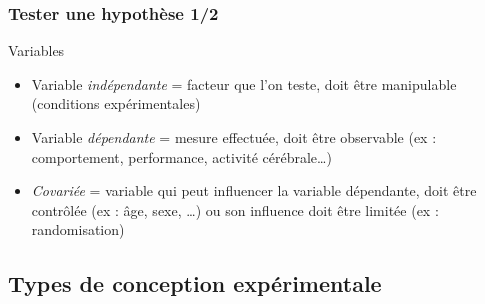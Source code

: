 \documentclass[xcolor=dvipsnames,english]{beamer}
\begin{document}
\begin{frame}
  \frametitle{Tester une hypothèse 1/2}
  \begin{block}{Variables}
    \begin{itemize}
      \item Variable \textit{indépendante} = facteur que l'on teste, doit être manipulable (conditions expérimentales)
      \item<2-> Variable \textit{dépendante} = mesure effectuée, doit être observable (ex : comportement, performance, activité cérébrale\dots)
      \item<3-> \textit{Covariée} = variable qui peut influencer la variable dépendante, doit être contrôlée (ex : âge, sexe, \dots) ou son influence doit être limitée (ex : randomisation)
    \end{itemize}
  \end{block}

\end{frame}

\subsection{Types de conception expérimentale}
\end{document}
